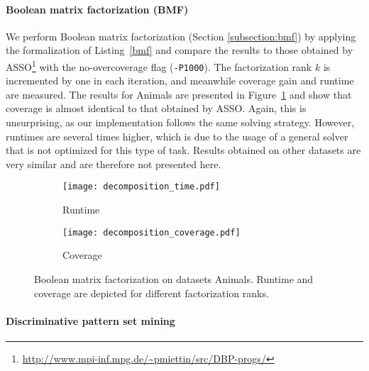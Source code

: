 \paragraph{Boolean matrix factorization (BMF)}
We perform Boolean matrix factorization (Section \ref{subsection:bmf}) by applying the formalization of Listing~\ref{bmf} and compare the results to those obtained by ASSO\footnote{\url{http://www.mpi-inf.mpg.de/~pmiettin/src/DBP-progs/}} \parencite{conf/icdm/Miettinen12} with the no-overcoverage flag (\texttt{-P1000}). The factorization rank $k$ is incremented by one in each iteration, and meanwhile coverage gain and runtime are measured. The results for Animals are presented in Figure~\ref{figure:bmf} and show that coverage is almost identical to that obtained by ASSO. Again, this is unsurprising, as our implementation follows the same solving strategy.  However, runtimes are several times higher, which is due to the usage of a general solver that is not optimized for this type of task. Results obtained on other datasets are very similar and are therefore not presented here.

\begin{figure}
\begin{center}
\begin{subfigure}{.49\textwidth}
\centering
\captionsetup{skip=-3pt}
  \texttt{[image: decomposition\_time.pdf]}
\caption{Runtime}
\end{subfigure}
   \hfill 
\begin{subfigure}{.49\textwidth}
\centering
\captionsetup{skip=-3pt}
  \texttt{[image: decomposition\_coverage.pdf]}
\caption{Coverage}
\end{subfigure}
  \captionsetup{skip=2pt}
  \caption{Boolean matrix factorization on datasets Animals. Runtime and coverage are depicted for different factorization ranks.}
  \label{figure:bmf}
  \end{center}
  \end{figure}

\paragraph{Discriminative pattern set mining}


